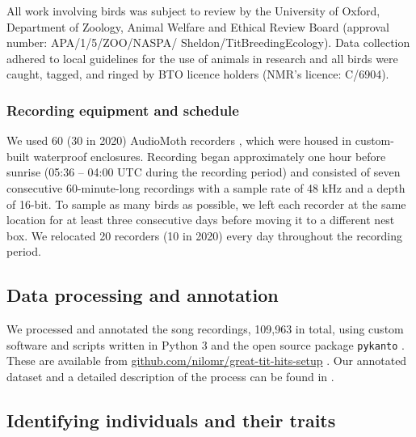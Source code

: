 \documentclass[9pt, twocolumn, twoside]{gsajnl}
\begin{document}
All work involving birds was subject to review by the University of Oxford, Department of Zoology, Animal Welfare and Ethical Review Board (approval number: APA/1/5/ZOO/NASPA/ Sheldon/TitBreedingEcology). Data collection adhered to local guidelines for the use of animals in research and all birds were caught, tagged, and ringed by BTO licence holders (NMR's licence: C/6904).

\subsubsection{Recording equipment and schedule}
We used 60 (30 in 2020) AudioMoth recorders \parencite{hill2019}, which were housed in custom-built waterproof enclosures. Recording began approximately one hour before sunrise (05:36 -- 04:00 UTC during the recording period) and consisted of seven consecutive 60-minute-long recordings with a sample rate of 48 kHz and a depth of 16-bit. To sample as many birds as possible, we left each recorder at the same location for at least three consecutive days before moving it to a different nest box. We relocated 20 recorders (10 in 2020) every day throughout the recording period.

\subsection{Data processing and annotation}

We processed and annotated the song recordings, 109,963 in total, using custom software and scripts written in Python 3 \parencite{vanrossum1995} and the open source package \texttt{pykanto} \parencite{merinorecalde2023}. These are available from \href{https://github.com/nilomr/great-tit-hits-setup}{github.com/nilomr/great-tit-hits-setup} \parencite{nilo_gretidataset_setup_2023}. Our annotated dataset and a detailed description of the process can be found in \textcite{merinorecalde2023a}.

\subsection{Identifying individuals and their traits}
\end{document}
